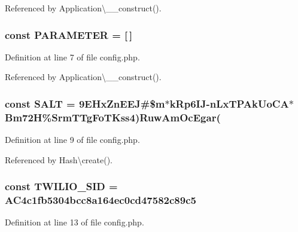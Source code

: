 Referenced by Application\textbackslash{}\+\_\+\+\_\+construct().

\hypertarget{config_8php_a75466fbd8ac40be3d3c185c9974118e7}{}
\subsubsection[{P\+A\+R\+A\+M\+E\+T\+E\+R}]{\setlength{\rightskip}{0pt plus 5cm}const P\+A\+R\+A\+M\+E\+T\+E\+R = \mbox{[}$\,$\mbox{]}}\label{config_8php_a75466fbd8ac40be3d3c185c9974118e7}


Definition at line 7 of file config.\+php.



Referenced by Application\textbackslash{}\+\_\+\+\_\+construct().

\hypertarget{config_8php_a6d448b74f10f8080293b329a47a046b4}{}
\subsubsection[{S\+A\+L\+T}]{\setlength{\rightskip}{0pt plus 5cm}const S\+A\+L\+T = \textquotesingle{}9\+E\+Hx\+Zn\+E\+E\+J\#\$m$\ast$k\+Rp6\+I\+J-\/n\+Lx\+T\+P\+Ak\+Uo\+C\+A$\ast$\+Bm72\+H\%\+Srm\+T\+Tg\+Fo\+T\+Kss4)\+Ruw\+Am\+Oc\+Egar(\textquotesingle{}}\label{config_8php_a6d448b74f10f8080293b329a47a046b4}


Definition at line 9 of file config.\+php.



Referenced by Hash\textbackslash{}create().

\hypertarget{config_8php_a9b6aafbdebd605cd4fb6f5749b53e59f}{}
\subsubsection[{T\+W\+I\+L\+I\+O\+\_\+\+S\+I\+D}]{\setlength{\rightskip}{0pt plus 5cm}const T\+W\+I\+L\+I\+O\+\_\+\+S\+I\+D = \textquotesingle{}A\+C4c1fb5304bcc8a164ec0cd47582c89c5\textquotesingle{}}\label{config_8php_a9b6aafbdebd605cd4fb6f5749b53e59f}


Definition at line 13 of file config.\+php.



